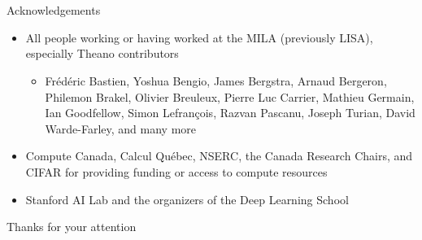 \documentclass[a4paper,9pt]{beamer}
\begin{document}
\section{}

\begin{frame}{Acknowledgements}
  \begin{itemize}
    \item All people working or having worked at the MILA (previously LISA), especially Theano contributors
      \begin{itemize}
        \item
          Frédéric Bastien,
          Yoshua Bengio,
          James Bergstra,
          Arnaud Bergeron,
          Philemon Brakel,
          Olivier Breuleux,
          Pierre Luc Carrier,
          Mathieu Germain,
          Ian Goodfellow,
          Simon Lefrançois,
          Razvan Pascanu,
          Joseph Turian,
          David Warde-Farley,
          and many more
      \end{itemize}
    \item Compute Canada, Calcul Québec, NSERC, the Canada Research Chairs, and CIFAR for providing funding or access to compute resources
    \item Stanford AI Lab and the organizers of the Deep Learning School
  \end{itemize}
\end{frame}

\begin{frame}[fragile]{Thanks for your attention}
  \vspace{.5cm}


  \vspace{.5cm}
\end{frame}
\end{document}
